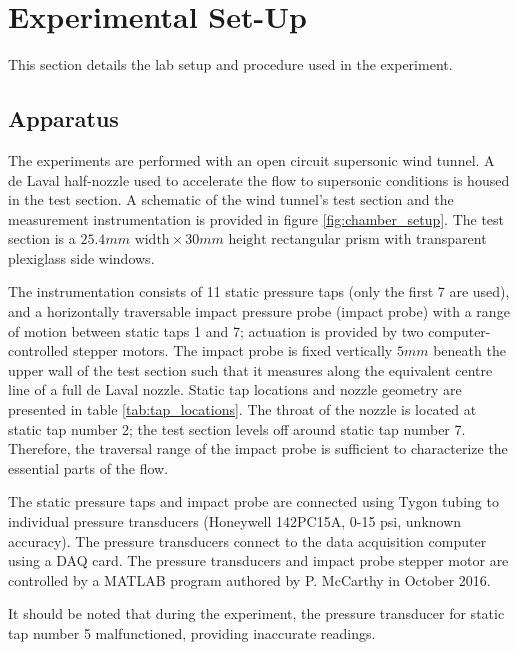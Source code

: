 \documentclass[runningheads]{llncs}
\begin{document}


\section{Experimental Set-Up}

\noindent
This section details the lab setup and procedure used in the experiment.

\subsection{Apparatus}

The experiments are performed with an open circuit supersonic wind tunnel. A de Laval half-nozzle used to accelerate the flow to supersonic conditions is housed in the test section. A schematic of the wind tunnel's test section and the measurement instrumentation is provided in figure \ref{fig:chamber_setup}. The test section is a $25.4\si{mm} \text{ width} \times30\si{mm} \text{ height}$ rectangular prism with transparent plexiglass side windows. \newline

\noindent
The instrumentation consists of 11 static pressure taps (only the first 7 are used), and a horizontally traversable impact pressure probe (impact probe) with a range of motion between static taps 1 and 7; actuation is provided by two computer-controlled stepper motors. The impact probe is fixed vertically $5\si{mm}$ beneath the upper wall of the test section such that it measures along the equivalent centre line of a full de Laval nozzle. Static tap locations and nozzle geometry are presented in table \ref{tab:tap_locations}. The throat of the nozzle is located at static tap number 2; the test section levels off around static tap number 7. Therefore, the traversal range of the impact probe is sufficient to characterize the essential parts of the flow.\newline

\noindent
The static pressure taps and impact probe are connected using Tygon tubing to individual pressure transducers (Honeywell 142PC15A, 0-15 psi, unknown accuracy). The pressure transducers connect to the data acquisition computer using a DAQ card. The pressure transducers and impact probe stepper motor are controlled by a MATLAB program authored by P. McCarthy in October 2016.\newline

\noindent
It should be noted that during the experiment, the pressure transducer for static tap number 5 malfunctioned, providing inaccurate readings.\newline
\end{document}
